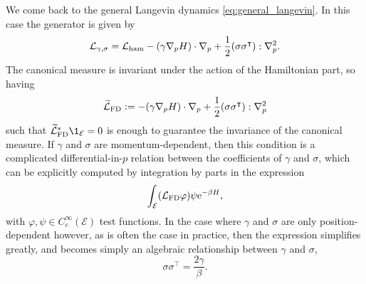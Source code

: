     \begin{remark}
        We come back to the general Langevin dynamics \eqref{eq:general_langevin}.
        In this case the generator is given by 
        \[\mathcal{L}_{\gamma,\sigma}=\mathcal{L}_{\rm ham}-(\gamma \nabla_p H)\cdot \nabla_p +\frac12(\sigma \sigma^\intercal) : \nabla_p^2.\]
        The canonical measure is invariant under the action of the Hamiltonian part, so having
        \[\widetilde{\mathcal{L}}_{\mathrm{FD}}\mathrel{\mathop:}= -(\gamma \nabla_p H)\cdot \nabla_p +\frac12(\sigma \sigma^\intercal) : \nabla_p^2 \]
        such that  $\widetilde{\cL}_{\mathrm{FD}}^*\1_\mathcal{E}=0$ is enough to guarantee the invariance of the canonical measure.
        If $\gamma$ and $\sigma$ are momentum-dependent, then this condition is a complicated differential-in-$p$ relation between the coefficients of $\gamma$ and $\sigma$, which can be explicitly computed by integration by parts in the expression
        \[\int_{\mathcal E} (\mathcal{L}_{\mathrm{FD}}\varphi)\psi\mathrm{e}^{-\beta H},\]
        with $\varphi, \psi \in C_c^\infty(\mathcal E)$ test functions. 
        In the case where $\gamma$ and $\sigma$ are only position-dependent however, as is often the case in practice, then the expression simplifies greatly, and becomes simply an algebraic relationship between $\gamma$ and $\sigma$,
        \begin{equation}
            \label{eq:general_fd_relation}
            \sigma \sigma^\intercal =\frac{2\gamma}{\beta}.
        \end{equation}
    \end{remark}

